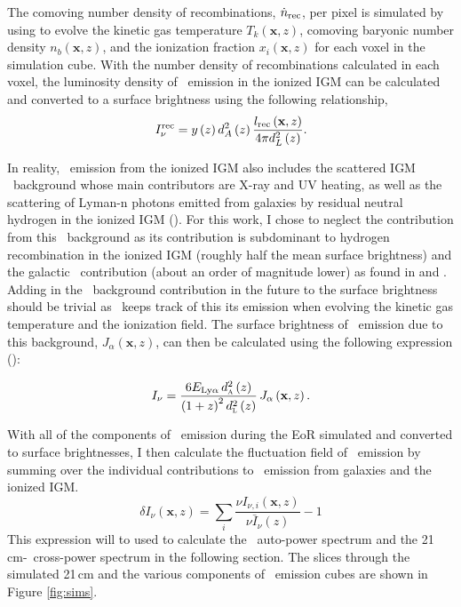 The comoving number density of recombinations, $\dot{n}_{\rm rec}$, per pixel is simulated
by using \fastsim to evolve the kinetic gas temperature $T_k \left( \textbf{x}, z \right)$,
comoving baryonic number density $n_{b} \left( \textbf{x}, z \right)$, and the ionization
fraction $x_{i} \left( \textbf{x}, z \right)$ for each voxel in the simulation cube.
With the number density of recombinations calculated in each voxel, the luminosity
density of \lya\ emission in the ionized IGM can be calculated and converted to
a surface brightness using the following relationship,
\begin{equation}
I_{\nu}^{\rm rec} = y \left(z \right) d_A^2 \left(z \right) \frac{l_{\rm rec} \left( \textbf{x}, z \right)}{4 \pi d_L^2 \left( z \right)}.
\end{equation}

In reality, \lya\ emission from the ionized IGM also includes the scattered IGM \lya\
background whose main contributors are X-ray and UV heating, as well as the scattering of Lyman-n
photons emitted from galaxies by residual neutral hydrogen in the ionized IGM (\cite{2007MNRAS.376.1680P}).
For this work, I chose to neglect the contribution from this \lya\ background as its contribution
is subdominant to hydrogen recombination in the ionized IGM (roughly half the mean surface brightness)
and the galactic \lya\ contribution (about an order of magnitude lower) as found in \cite{2013ApJ...763..132S} and
\cite{2017ApJ...848...52H}. Adding in
the \lya\ background contribution in the future to the surface brightness should be
trivial as \fastsim\ keeps track of this its emission when evolving the kinetic
gas temperature and the ionization field. The surface brightness
of \lya\ emission due to this background, $J_{\alpha} \left( \textbf{x}, z\right)$, can then be
calculated using the following expression (\cite{2013ApJ...763..132S}):

\begin{equation}
  I_{\nu} = \frac{6 E_{\text{Ly}\alpha}\, d_\textsc{a}^2 \left(z \right)}{\left( 1 + z\right)^2 d_\textsc{l}^2 \left( z \right)}\, J_{\alpha} \left( \textbf{x}, z \right).
\end{equation}

With all of the components of \lya\ emission during the EoR simulated and converted to surface brightnesses,
I then calculate the fluctuation field of \lya\ emission by summing over the individual
contributions to \lya\ emission from galaxies and the ionized IGM.
\begin{equation}
  \delta I_{\nu} \left(\textbf{x}, z \right) = \sum_i \frac{\nu I_{\nu, i} \left(\textbf{x}, z \right)}{\nu \bar{I}_{\nu} \left(z \right)} - 1
\end{equation}
This expression will to used to calculate the \lya\ auto-power spectrum and the 21\,cm-\lya\
cross-power spectrum in the following section. The slices through the simulated 21\,cm and the various
components of \lya\ emission cubes are shown in Figure \ref{fig:sims}.

